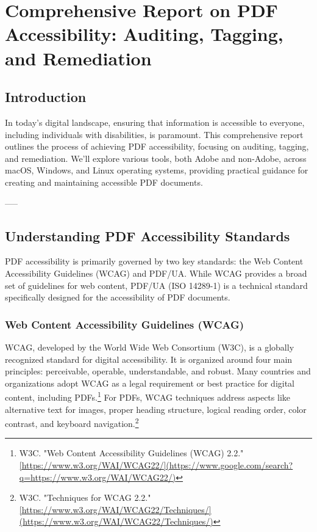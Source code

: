\chapter{Comprehensive Report on PDF Accessibility: Auditing, Tagging, and Remediation}
\label{chap:pdf-accessibility}

\section{Introduction}
\label{sec:introduction}
In today's digital landscape, ensuring that information is accessible to everyone, including individuals with disabilities, is paramount. This comprehensive report outlines the process of achieving PDF accessibility, focusing on auditing, tagging, and remediation. We'll explore various tools, both Adobe and non-Adobe, across macOS, Windows, and Linux operating systems, providing practical guidance for creating and maintaining accessible PDF documents.

-----

\section{Understanding PDF Accessibility Standards}
\label{sec:pdf-accessibility-standards}
PDF accessibility is primarily governed by two key standards: the Web Content Accessibility Guidelines (WCAG) and PDF/UA. While WCAG provides a broad set of guidelines for web content, PDF/UA (ISO 14289-1) is a technical standard specifically designed for the accessibility of PDF documents.

\subsection{Web Content Accessibility Guidelines (WCAG)}
\label{subsec:wcag}
WCAG, developed by the World Wide Web Consortium (W3C), is a globally recognized standard for digital accessibility. It is organized around four main principles: perceivable, operable, understandable, and robust. Many countries and organizations adopt WCAG as a legal requirement or best practice for digital content, including PDFs.\footnote{W3C. "Web Content Accessibility Guidelines (WCAG) 2.2." \url{[https://www.w3.org/WAI/WCAG22/](https://www.google.com/search?q=https://www.w3.org/WAI/WCAG22/)}} For PDFs, WCAG techniques address aspects like alternative text for images, proper heading structure, logical reading order, color contrast, and keyboard navigation.\footnote{W3C. "Techniques for WCAG 2.2." \url{[https://www.w3.org/WAI/WCAG22/Techniques/](https://www.w3.org/WAI/WCAG22/Techniques/)}}

